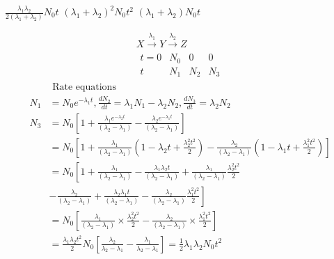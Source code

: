 \begin{enumerate}
\begin{tasks}
	\task[\textbf{B.}]$\frac{\lambda_{1} \lambda_{2}}{2\left(\lambda_{1}+\lambda_{2}\right)} N_{0} t$
	\task[\textbf{C.}]$\left(\lambda_{1}+\lambda_{2}\right)^{2} N_{0} t^{2}$
	\task[\textbf{D.}] $\left(\lambda_{1}+\lambda_{2}\right) N_{0} t$
\end{tasks}
\begin{answer}
	\begin{align*}
	X \stackrel{\lambda_{1}}{\longrightarrow} Y \stackrel{\lambda_{2}}{\longrightarrow} Z\\
	\begin{array}{cccc}
	t=0 & N_{0} & 0 & 0 \\
	t & N_{1} & N_{2} & N_{3}
	\end{array}
	\end{align*}
	\begin{align*}
	&\text { Rate equations }\\
	N_{1}&=N_{0} e^{-\lambda_{1} t}, \frac{d N_{2}}{d t}=\lambda_{1} N_{1}-\lambda_{2} N_{2}, \frac{d N_{3}}{d t}=\lambda_{2} N_{2}\\
	N_{3}&=N_{0}\left[1+\frac{\lambda_{1} e^{-\lambda_{2} t}}{\left(\lambda_{2}-\lambda_{1}\right)}-\frac{\lambda_{2} e^{-\lambda_{1} t}}{\left(\lambda_{2}-\lambda_{1}\right)}\right]\\
	&=N_{0}\left[1+\frac{\lambda_{1}}{\left(\lambda_{2}-\lambda_{1}\right)}\left(1-\lambda_{2} t+\frac{\lambda_{2}^{2} t^{2}}{2}\right)-\frac{\lambda_{2}}{\left(\lambda_{2}-\lambda_{1}\right)}\left(1-\lambda_{1} t+\frac{\lambda_{1}^{2} t^{2}}{2}\right)\right]\\
	&=N_{0}\left[1+\frac{\lambda_{1}}{\left(\lambda_{2}-\lambda_{1}\right)}-\frac{\lambda_{1} \lambda_{2} t}{\left(\lambda_{2}-\lambda_{1}\right)}+\frac{\lambda_{1}}{\left(\lambda_{2}-\lambda_{1}\right)} \frac{\lambda_{2}^{2} t^{2}}{2}\right.\\
	&\left.-\frac{\lambda_{2}}{\left(\lambda_{2}-\lambda_{1}\right)}+\frac{\lambda_{2} \lambda_{1} t}{\left(\lambda_{2}-\lambda_{1}\right)}-\frac{\lambda_{2}}{\left(\lambda_{2}-\lambda_{1}\right)} \frac{\lambda_{1}^{2} t^{2}}{2}\right]\\
	&=N_{0}\left[\frac{\lambda_{1}}{\left(\lambda_{2}-\lambda_{1}\right)} \times \frac{\lambda_{2}^{2} t^{2}}{2}-\frac{\lambda_{2}}{\left(\lambda_{2}-\lambda_{1}\right)} \times \frac{\lambda_{1}^{2} t^{2}}{2}\right]\\
	&=\frac{\lambda_{1} \lambda_{2} t^{2}}{2} N_{0}\left[\frac{\lambda_{2}}{\lambda_{2}-\lambda_{1}}-\frac{\lambda_{1}}{\lambda_{2}-\lambda_{1}}\right]=\frac{1}{2} \lambda_{1} \lambda_{2} N_{0} t^{2}

\end{align*}
\end{answer}
\end{enumerate}
